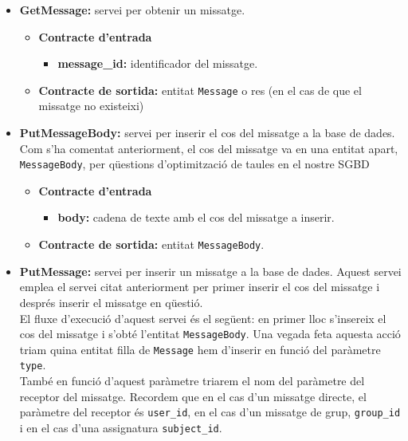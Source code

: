 		\begin{itemize}
			
			\item \textbf{GetMessage:} servei per obtenir un missatge.
			
			\begin{itemize}
					\item \textbf{Contracte d'entrada}
						\begin{itemize}
							\item \textbf{message\_id:} identificador del missatge.
						\end{itemize}
					\item \textbf{Contracte de sortida:} entitat \texttt{Message} o res (en el cas de que el missatge no existeixi)
			\end{itemize}
				
							
			\item \textbf{PutMessageBody:} servei per inserir el cos del missatge a la base de dades. Com s'ha comentat anteriorment, el cos del missatge va en una entitat apart, \texttt{MessageBody}, per qüestions d'optimització de taules en el nostre \ac{SGBD}
			
			\begin{itemize}
					\item \textbf{Contracte d'entrada}
						\begin{itemize}
							\item \textbf{body:} cadena de texte amb el cos del missatge a inserir.
						\end{itemize}
					\item \textbf{Contracte de sortida:} entitat \texttt{MessageBody}.
			\end{itemize}

			\item \textbf{PutMessage:} servei per inserir un missatge a la base de dades. Aquest servei emplea el servei citat anteriorment per primer inserir el cos del missatge i després inserir el missatge en qüestió.\\
			
			El fluxe d'execució d'aquest servei és el següent: en primer lloc s'insereix el cos del missatge i s'obté l'entitat \texttt{MessageBody}. Una vegada feta aquesta acció triam quina entitat filla de \texttt{Message} hem d'inserir en funció del paràmetre \texttt{type}. \\
			
			També en funció d'aquest paràmetre triarem el nom del paràmetre del receptor del missatge. Recordem que en el cas d'un missatge directe, el paràmetre del receptor és \texttt{user\_id}, en el cas d'un missatge de grup, \texttt{group\_id} i en el cas d'una assignatura \texttt{subject\_id}.\\
			

\end{itemize}
